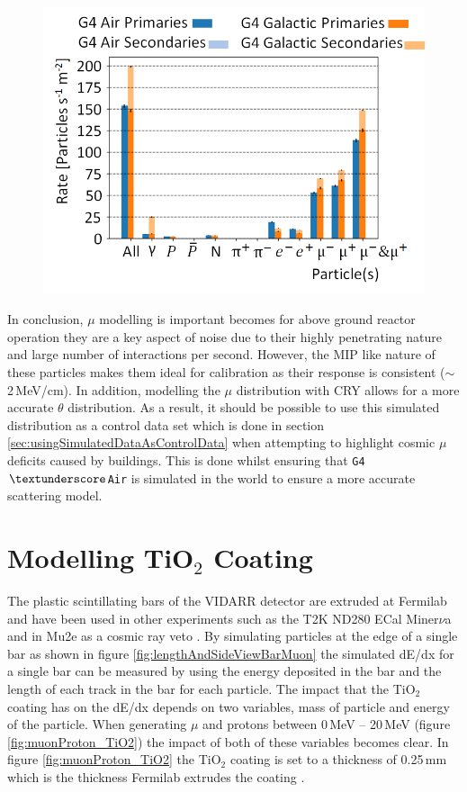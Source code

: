 \begin{figure}[!h]
 \centering
 \includegraphics[width=0.7\linewidth]{Chapter4/Figs/Raster/CryPlots/CRY_ratesMedText.png}
 \label{fig:CRY_rates}
\end{figure}

In conclusion, $\mu$ modelling is important becomes for above ground reactor operation they are a key aspect of noise due to their highly penetrating nature and large number of interactions per second. However, the MIP like nature of these particles makes them ideal for calibration as their response is consistent ($\sim$ 2\,MeV/cm). In addition, modelling the $\mu$ distribution with CRY \cite{ieee_cry_2007} allows for a more accurate $\theta$ distribution. As a result, it should be possible to use this simulated distribution as a control data set which is done in section \ref{sec:usingSimulatedDataAsControlData} when attempting to highlight cosmic $\mu$ deficits caused by buildings. This is done whilst ensuring that \texttt{G4$\textunderscore$Air} is simulated in the world to ensure a more accurate scattering model. 

\clearpage
\section{Modelling TiO$_2$ Coating}
The plastic scintillating bars of the VIDARR detector are extruded at Fermilab and have been used in other experiments such as the T2K ND280 ECal \cite{Allan_2013} Miner$\nu$a \cite{aliaga2014design} and in Mu2e as a cosmic ray veto \cite{Pla-Dalmau2014}. By simulating particles at the edge of a single bar as shown in figure \ref{fig:lengthAndSideViewBarMuon} the simulated dE/dx for a single bar can be measured by using the energy deposited in the bar and the length of each track in the bar for each particle. The impact that the TiO$_2$ coating has on the dE/dx depends on two variables, mass of particle and energy of the particle. When generating $\mu$ and protons between 0\,MeV -- 20\,MeV (figure \ref{fig:muonProton_TiO2}) the impact of both of these variables becomes clear. In figure \ref{fig:muonProton_TiO2} the TiO$_2$ coating is set to a thickness of 0.25\,mm which is the thickness Fermilab extrudes the coating \cite{Pla-Dalmau2014}.

